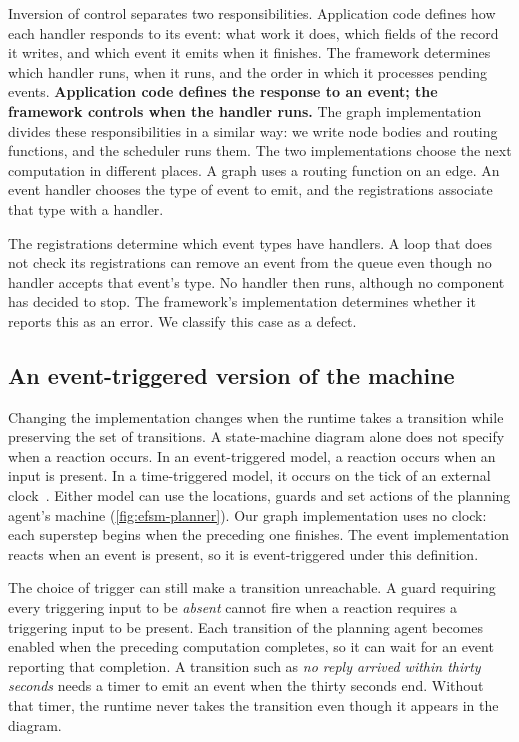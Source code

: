 Inversion of control separates two responsibilities. Application code defines how each handler
responds to its event: what work it does, which fields of the record it writes, and which event it
emits when it finishes. The framework determines which handler runs, when it runs, and the order
in which it processes pending events. \textbf{Application code defines the response to an event;
the framework controls when the handler runs.} The graph implementation divides these
responsibilities in a similar way: we write node bodies and routing functions, and the scheduler
runs them. The two implementations choose the next computation in different places. A graph uses
a routing function on an edge. An event handler chooses the type of event to emit, and the
registrations associate that type with a handler.

The registrations determine which event types have handlers. A loop that does not check its
registrations can remove an event from the queue even though no handler accepts that event's
type. No handler then runs, although no component has decided to stop. The framework's
implementation determines whether it reports this as an error. We classify this case as a defect.

\subsection{An event-triggered version of the machine}
\label{sec:events-machine}

Changing the implementation changes when the runtime takes a transition while preserving the
set of transitions. A state-machine diagram alone does not specify when a reaction occurs. In an
event-triggered model, a reaction occurs when an input is present. In a time-triggered model, it
occurs on the tick of an external clock~\citep[slides~23--25]{seshia2015discrete}. Either model can
use the locations, guards and set actions of the planning agent's machine
(\cref{fig:efsm-planner}). Our graph implementation uses no clock: each superstep begins when the
preceding one finishes. The event implementation reacts when an event is present, so it is
event-triggered under this definition.

The choice of trigger can still make a transition unreachable. A guard requiring every triggering
input to be \emph{absent} cannot fire when a reaction requires a triggering input to be present.
Each transition of the planning agent becomes enabled when the preceding computation completes,
so it can wait for an event reporting that completion. A transition such as \emph{no reply arrived
within thirty seconds} needs a timer to emit an event when the thirty seconds end. Without that
timer, the runtime never takes the transition even though it appears in the diagram.

